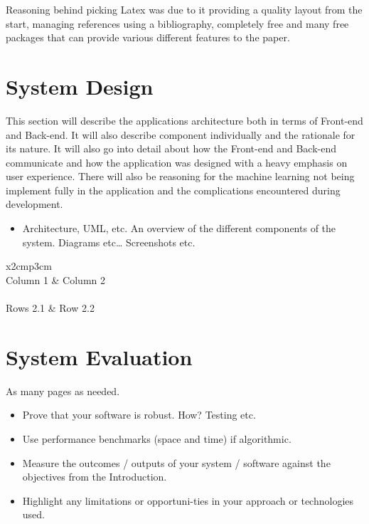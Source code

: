 Reasoning behind picking Latex was due to it providing a quality layout from the start, managing references using a bibliography, completely free and many free packages that can provide various different features to the paper.

\chapter{System Design}
This section will describe the applications architecture both in terms of Front-end and Back-end. It will also describe component individually and the rationale for its nature. It will also go into detail about how the Front-end and Back-end communicate and how the application was designed with a heavy emphasis on user experience. There will also be reasoning for  the machine learning not being implement fully in the application and the complications encountered during development. 

\begin{itemize}
\item Architecture, UML, etc. An overview of the different components of the system. Diagrams etc… Screenshots etc.
\end{itemize}

\begin{table}[h]
  \centering
  \begin{tabular}{x{2cm}p{3cm}}
    \toprule \\
    Column 1 & Column 2 \\
    \midrule \\
    Rows 2.1 & Row 2.2 \\
    \bottomrule
  \end{tabular}
  \caption{A table.}
  \label{table:mytable}
\end{table}

\chapter{System Evaluation}
As many pages as needed.
\begin{itemize}
\item Prove that your software is robust. How? Testing etc. 
\item Use performance benchmarks (space and time) if algorithmic.
\item Measure the outcomes / outputs of your system / software against the objectives from the Introduction.
\item Highlight any limitations or opportuni-ties in your approach or technologies used.
\end{itemize}

